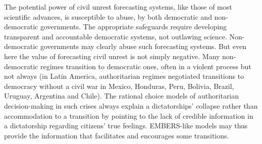 The potential power of civil unrest forecasting systems, like those 
of most scientific advances, is susceptible to abuse, by 
both democratic and non-democratic governments. The appropriate safeguards require 
developing transparent and accountable democratic systems, not outlawing science. 
Non-democratic governments may clearly abuse such forecasting systems. But even 
here the value of forecasting civil unrest is not simply negative. Many non-democratic regimes transition to democratic 
ones, often in a violent process but not always (in Latin America, authoritarian regimes negotiated 
transitions to democracy without a civil war in Mexico, Honduras, Peru, Bolivia, Brazil, 
Uruguay, Argentina and Chile). The rational choice models of authoritarian decision-making in 
such crises always explain a dictatorships’ collapse rather than accommodation to 
a transition by pointing to the lack of credible information in 
a dictatorship regarding citizens’ true feelings. EMBERS-like models may thus provide the 
information that facilitates and encourages some transitions.

